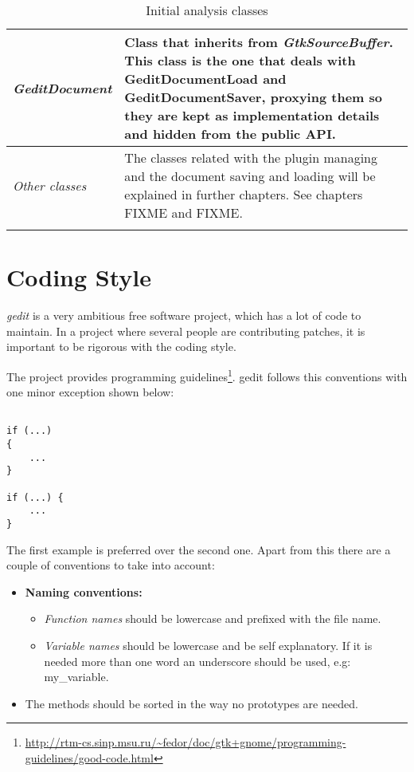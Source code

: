 \begin{table}[H]
\begin{center}
\begin{tabularx}{\textwidth}{|l|X|}
      \hline
      \textit{GeditDocument} & Class that inherits from \emph{GtkSourceBuffer}. This class is the one that deals with GeditDocumentLoad and GeditDocumentSaver, proxying them so they are kept as implementation details and hidden from the public API. \\
      \hline
      \textit{Other classes} & The classes related with the plugin managing and the document saving and loading will be explained in further chapters. See chapters FIXME and FIXME. \\
      \lasthline
    \end{tabularx}
    \caption{Initial analysis classes}
  \end{center}
\end{table}

\newpage
\section{Coding Style}\label{sec:CodingStyle}

\emph{gedit} is a very ambitious free software project, which has a lot of code to maintain. In a project where several people are contributing patches, it is important to be rigorous with the coding style.

The \GNOME project provides programming guidelines\footnote{\url{http://rtm-cs.sinp.msu.ru/~fedor/doc/gtk+gnome/programming-guidelines/good-code.html}}. gedit follows this conventions with one minor exception shown below:
\begin{lstlisting}[style=GObject]

if (...)
{
	...
}

if (...) {
	...
}

\end{lstlisting}

The first example is preferred over the second one. Apart from this there are a couple of conventions to take into account:
\begin{itemize}
  \item \textbf{Naming conventions:}
    \begin{itemize}
      \item \emph{Function names} should be lowercase and prefixed with the file name.
      \item \emph{Variable names} should be lowercase and be self explanatory. If it is needed more than one word an underscore should be used, e.g:  my\_variable.
    \end{itemize}
  \item The methods should be sorted in the way no prototypes are needed.
\end{itemize}

